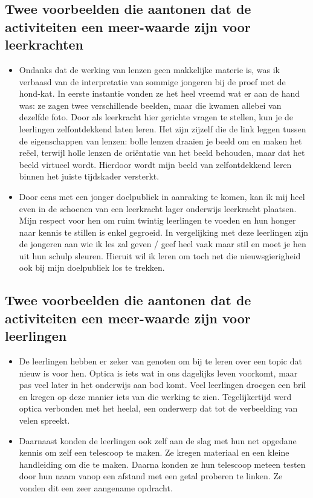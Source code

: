 \documentclass[a4paper,12pt,twoside]{article}%
\begin{document}
	\subsection{Twee voorbeelden die aantonen dat de activiteiten een meer-waarde zijn voor leerkrachten}
	\begin{itemize}%
		\item Ondanks dat de werking van lenzen geen makkelijke materie is, was ik verbaasd van de interpretatie van sommige jongeren bij de proef met de hond-kat. In eerste instantie vonden ze het heel vreemd wat er aan de hand was: ze zagen twee verschillende beelden, maar die kwamen allebei van dezelfde foto. Door als leerkracht hier gerichte vragen te stellen, kun je de leerlingen zelfontdekkend laten leren. Het zijn zijzelf die de link leggen tussen de eigenschappen van lenzen: bolle lenzen draaien je beeld om en maken het reëel, terwijl holle lenzen de oriëntatie van het beeld behouden, maar dat het beeld virtueel wordt. Hierdoor wordt mijn beeld van zelfontdekkend leren  binnen het juiste tijdskader versterkt.
		\item Door eens met een jonger doelpubliek in aanraking te komen, kan ik mij heel even in de schoenen van een leerkracht lager onderwijs leerkracht plaatsen. Mijn respect voor hen om ruim twintig leerlingen te voeden en hun honger naar kennis te stillen is enkel gegroeid. In vergelijking met deze leerlingen zijn de jongeren aan wie ik les zal geven / geef heel vaak maar stil en moet je hen uit hun schulp sleuren. Hieruit wil ik leren om toch net die nieuwsgierigheid ook bij mijn doelpubliek los te trekken.
	\end{itemize}
	
	\subsection{Twee voorbeelden die aantonen dat de activiteiten een meer-waarde zijn voor leerlingen}
	\begin{itemize}
		\item De leerlingen hebben er zeker van genoten om bij te leren over een topic dat nieuw is voor hen. Optica is iets wat in ons dagelijks leven voorkomt, maar pas veel later in het onderwijs aan bod komt. Veel leerlingen droegen een bril en kregen op deze manier iets van die werking te zien. Tegelijkertijd werd optica verbonden met het heelal, een onderwerp dat tot de verbeelding van velen spreekt.
		\item Daarnaast konden de leerlingen ook zelf aan de slag met hun net opgedane kennis om zelf een telescoop te maken. Ze kregen materiaal en een kleine handleiding om die te maken. Daarna konden ze hun telescoop meteen testen door hun naam vanop een afstand met een getal proberen te linken. Ze vonden dit een zeer aangename opdracht.
	\end{itemize}
	
\end{document}
